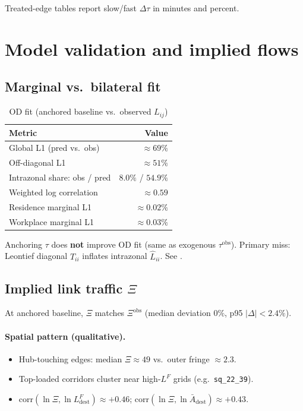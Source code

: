 \documentclass[12pt]{article}
\newcommand{\Abar}{\bar A}
\newcommand{\obs}{\mathrm{obs}}
\newcommand{\corr}{\mathrm{corr}}
\begin{document}
Treated-edge tables report slow/fast $\Delta\tau$ in minutes and percent.

\section{Model validation and implied flows}\label{sec:validation}

\subsection{Marginal vs.\ bilateral fit}

\begin{table}[htbp]
  \centering
  \caption{OD fit (anchored baseline vs.\ observed $L_{ij}$)}
  \begin{tabular}{lr}
  \toprule
  Metric & Value \\
  \midrule
  Global L1 (pred vs.\ obs) & $\approx 69\%$ \\
  Off-diagonal L1 & $\approx 51\%$ \\
  Intrazonal share: obs / pred & $8.0\%$ / $54.9\%$ \\
  Weighted log correlation & $\approx 0.59$ \\
  Residence marginal L1 & $\approx 0.02\%$ \\
  Workplace marginal L1  & $\approx 0.03\%$ \\
  \bottomrule
  \end{tabular}
\end{table}

Anchoring $\tau$ does \textbf{not} improve OD fit (same as exogenous $\tau^{\obs}$).
Primary miss: Leontief diagonal $T_{ii}$ inflates intrazonal $\widehat{L}_{ii}$.
See .

\subsection{Implied link traffic $\Xi$}

At anchored baseline, $\Xi$ matches $\Xi^{\obs}$ (median deviation $0\%$,
p95 $|\Delta|<2.4\%$).

\paragraph{Spatial pattern (qualitative).}
\begin{itemize}[leftmargin=2em]
  \item Hub-touching edges: median $\Xi\approx 49$ vs.\ outer fringe $\approx 2.3$.
  \item Top-loaded corridors cluster near high-$L^F$ grids (e.g.\ \texttt{sq\_22\_39}).
  \item $\corr(\ln\Xi,\ln L^F_{\mathrm{dest}})\approx +0.46$; $\corr(\ln\Xi,\ln\Abar_{\mathrm{dest}})\approx +0.43$.
\end{itemize}
\end{document}
